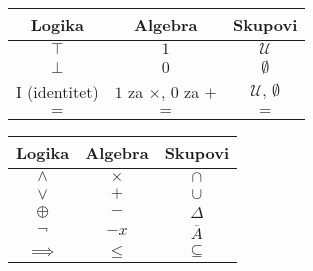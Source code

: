 \begin{center}
    \begin{multicols}{2}
        \begin{tabular}{c|c|c}
            Logika & Algebra & Skupovi\\
            \hline
            $\top$ & $1$ & $\mathcal{U}$\\
            $\bot$ & $0$ & $\emptyset$\\
            $\mathrm{I}$ (identitet) & $1$ za $\times$, $0$ za $+$ & $\mathcal{U},\,\emptyset$\\
            $=$ & $=$ & $=$\\

        \end{tabular}

        \columnbreak

        \begin{tabular}{c|c|c}
            Logika & Algebra & Skupovi\\
            \hline
            $\wedge$ & $\times$ & $\cap$\\
            $\vee$ & $+$ & $\cup$\\
            $\oplus$ & $-$ & $\Delta$\\
            $\neg$ & $-x$ & $\overline{A}$\\
            $\implies$ & $\leq$ & $\subseteq$\\
        \end{tabular}
    \end{multicols}
\end{center}
